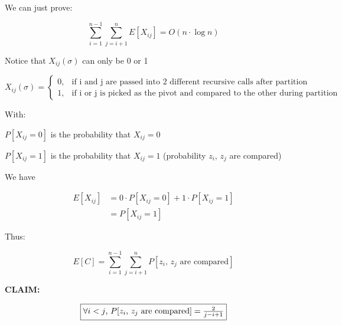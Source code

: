 \documentclass{article}
\begin{document}
\bigskip

\noindent We can just prove:

\begin{equation*}
\sum_{i=1}^{n-1} \sum_{j=i+1}^{n} E[X_{ij}] = O(n \cdot \log n)
\end{equation*}


\bigskip

\noindent Notice that $X_{ij}(\sigma)$ can only be 0 or 1

\begin{equation*}
X_{ij}(\sigma) = 
\begin{cases}
    0,& \text{if i and j are passed into 2 different recursive calls after partition}\\
    1,& \text{if i or j is picked as the pivot and compared to the other during partition}
\end{cases}
\end{equation*}

\bigskip

\noindent With:

\bigskip

$P[X_{ij}=0]$ is the probability that $X_{ij} = 0$

\bigskip

$P[X_{ij}=1]$ is the probability that $X_{ij} = 1$ (probability $z_i$, $z_j$ are compared)

\bigskip

\noindent We have

\begin{equation*}
\begin{split}
E[X_{ij}] & = 0 \cdot P[X_{ij}=0] + 1 \cdot P[X_{ij}=1] \\
& = P[X_{ij}=1]
\end{split}
\end{equation*}

\bigskip

\noindent Thus:

\begin{equation*}\tag{*}
E[C] = \sum_{i=1}^{n-1} \sum_{j=i+1}^{n} P[z_i \text{, } z_j \text{ are compared}]
\end{equation*}

\bigskip

\noindent \textbf{CLAIM:}

\begin{equation*}
\boxed{\forall i < j$, $P[z_i \text{, } z_j \text{ are compared}] = \frac{2}{j - i + 1}}
\end{equation*}
\end{document}

